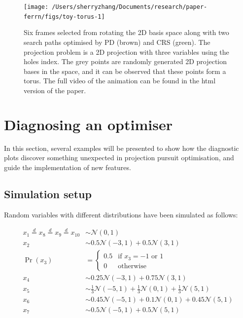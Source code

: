 \begin{Schunk}
\begin{figure}

{\centering \texttt{[image: /Users/sherryzhang/Documents/research/paper-ferrn/figs/toy-torus-1]} 

}

\caption[Six frames selected from rotating the 2D basis space along with two search paths optimised by PD (brown) and CRS (green)]{Six frames selected from rotating the 2D basis space along with two search paths optimised by PD (brown) and CRS (green). The projection problem is a 2D projection with three variables using the holes index. The grey points are randomly generated 2D projection bases in the space, and it can be observed that these points form a torus. The full video of the animation can be found in the html version of the paper.}\label{fig:toy-torus}
\end{figure}
\end{Schunk}

\hypertarget{application}{%
\section{Diagnosing an optimiser}\label{application}}

In this section, several examples will be presented to show how the
diagnostic plots discover something unexpected in projection pursuit
optimisation, and guide the implementation of new features.

\hypertarget{simulation-setup}{%
\subsection{Simulation setup}\label{simulation-setup}}

Random variables with different distributions have been simulated as
follows:

\begin{align}
x_1 \overset{d}{=} x_8 \overset{d}{=} x_9 \overset{d}{=} x_{10}& \sim \mathcal{N}(0, 1) \\
x_2 &\sim 0.5 \mathcal{N}(-3, 1) + 0.5 \mathcal{N}(3, 1)\\
\Pr(x_3) &= 
\begin{cases}
0.5 & \text{if $x_3 = -1$ or $1$}\\
0 & \text{otherwise}
\end{cases}\\
x_4 &\sim 0.25 \mathcal{N}(-3, 1) + 0.75 \mathcal{N}(3, 1)\\
x_5 &\sim \frac{1}{3} \mathcal{N}(-5, 1) + \frac{1}{3} \mathcal{N}(0, 1) + \frac{1}{3} \mathcal{N}(5, 1)\\
x_6 &\sim 0.45 \mathcal{N}(-5, 1) + 0.1 \mathcal{N}(0, 1) + 0.45 \mathcal{N}(5, 1)\\
x_7 &\sim 0.5 \mathcal{N}(-5, 1) + 0.5 \mathcal{N}(5, 1) 
\end{align}


